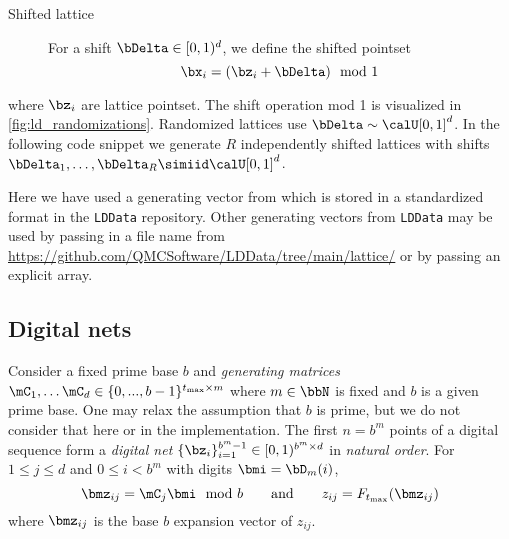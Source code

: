 \documentclass[acmsmall]{acmart}
\newcommand{\FJHNote}[1]{\textcolor{blue}{#1}}
\begin{document}
\begin{description}
    \item[Shifted lattice] For a shift $\bDelta \in [0,1)^d$, we define the shifted pointset 
    $$\bx_i= (\bz_i + \bDelta) \mod 1$$ 
\end{description}
where $\bz_i$ are lattice pointset. The shift operation mod 1 is visualized in \cref{fig:ld_randomizations}. Randomized lattices use $\bDelta \sim \calU[0,1]^d$. In the following code snippet we generate $R$ independently shifted lattices with shifts $\bDelta_1,\dots,\bDelta_R \simiid \calU[0,1]^d$. 

Here we have used a generating vector from \citep{cools2006constructing} which is stored in a standardized format in the \texttt{LDData} repository. Other generating vectors from \texttt{LDData} may be used by passing in a file name from \url{https://github.com/QMCSoftware/LDData/tree/main/lattice/} or by passing an explicit array. 


\subsection{Digital nets} 

Consider a fixed prime base $b$ and \emph{generating matrices} $\mC_1,\dots\mC_d \in \{0,...,b-1\}^{t_\mathrm{max} \times m}$ where $m \in \bbN$ is fixed and $b$ is a given prime base. One may relax the assumption that $b$ is prime, but we do not consider that here or in the implementation. The first $n=b^m$ points of a digital sequence form a \emph{digital net} $\{\bz_i\}_{i=1}^{b^m-1} \in [0,1)^{b^m \times d}$ in \emph{natural order}. For $1 \leq j \leq d$ and $0 \leq i < b^m$ with digits $\bmi = \bD_m(i)$,
$$\bmz_{ij} = \mC_j \bmi \mod b \qquad\text{and}\qquad z_{ij} = F_{t_\mathrm{max}}(\bmz_{ij})$$
where $\bmz_{ij}$ is the base $b$ expansion vector of $z_{ij}$. 
\end{document}

